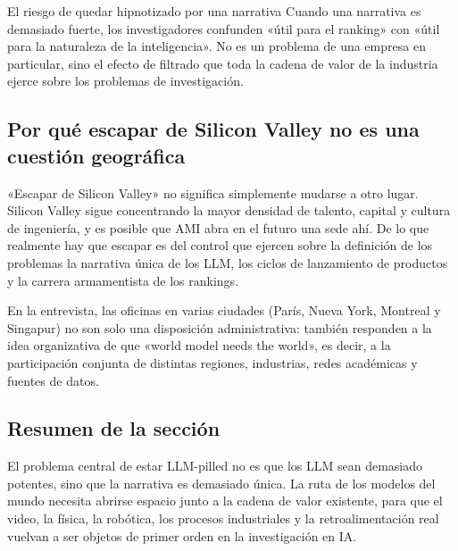 \begin{warningbox}{El riesgo de quedar hipnotizado por una narrativa}
Cuando una narrativa es demasiado fuerte, los investigadores confunden «útil para el ranking» con «útil para la naturaleza de la inteligencia». No es un problema de una empresa en particular, sino el efecto de filtrado que toda la cadena de valor de la industria ejerce sobre los problemas de investigación.
\end{warningbox}

\subsection{Por qué escapar de Silicon Valley no es una cuestión geográfica}

«Escapar de Silicon Valley» no significa simplemente mudarse a otro lugar. Silicon Valley sigue concentrando la mayor densidad de talento, capital y cultura de ingeniería, y es posible que AMI abra en el futuro una sede ahí. De lo que realmente hay que escapar es del control que ejercen sobre la definición de los problemas la narrativa única de los LLM, los ciclos de lanzamiento de productos y la carrera armamentista de los rankings.

En la entrevista, las oficinas en varias ciudades (París, Nueva York, Montreal y Singapur) no son solo una disposición administrativa: también responden a la idea organizativa de que «world model needs the world», es decir, a la participación conjunta de distintas regiones, industrias, redes académicas y fuentes de datos.

\subsection{Resumen de la sección}

El problema central de estar LLM-pilled no es que los LLM sean demasiado potentes, sino que la narrativa es demasiado única. La ruta de los modelos del mundo necesita abrirse espacio junto a la cadena de valor existente, para que el video, la física, la robótica, los procesos industriales y la retroalimentación real vuelvan a ser objetos de primer orden en la investigación en IA.
